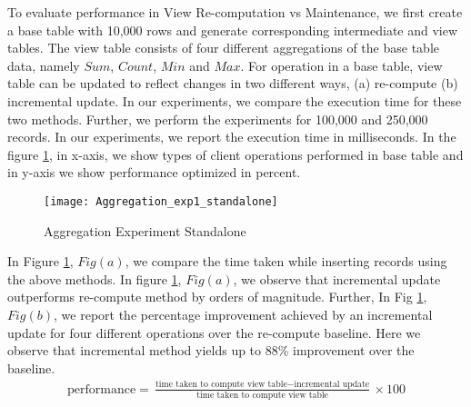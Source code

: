 \documentclass[11pt,a4paper,bibtotoc,idxtotoc,headsepline,footsepline,footexclude,BCOR12mm,DIV13]{scrbook}
\begin{document}
To evaluate performance in View Re-computation vs Maintenance, we first create a base table with 10,000 rows and generate corresponding intermediate and view tables. The view table consists of four different aggregations of the base table data, namely $Sum$, $Count$, $Min$ and $Max$. For operation in a base table, view table can be updated to reflect changes in two different ways, (a) re-compute (b) incremental update. In our experiments, we compare the execution time for these two methods. Further, we perform the experiments for 100,000 and 250,000 records. In our experiments, we report the execution time in milliseconds. In the figure \ref{sec:AggrExpStandalone}, in x-axis, we show types of client operations performed in base table and in y-axis we show performance optimized in percent. 

\begin{figure}
	\centering
	\texttt{[image: Aggregation\_exp1\_standalone]}
	\caption{Aggregation Experiment Standalone}
	\label{sec:AggrExpStandalone}
\end{figure} 
\newpage
In Figure \ref{sec:AggrExpStandalone}, $Fig(a)$, we compare the time taken while inserting records using the above methods. In figure \ref{sec:AggrExpStandalone}, $Fig(a)$, we observe that incremental update outperforms re-compute method by orders of magnitude. Further, In Fig \ref{sec:AggrExpStandalone}, $Fig(b)$, we report the percentage improvement achieved by an incremental update for four different operations over the re-compute baseline. Here we observe that incremental method yields up to 88\% improvement over the baseline.
\newline
\begin{align*}
\text{performance} = \frac{\text{time taken to compute view table} - \text{incremental update}}{\text{time taken to compute view table}} \times 100
\end{align*}
	 
\end{document}
